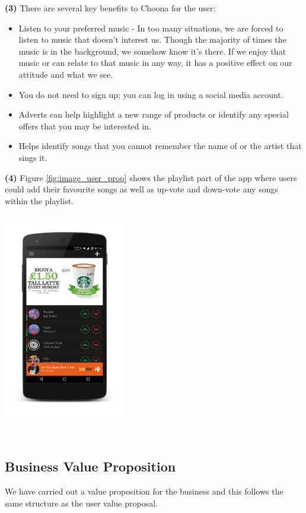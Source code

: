 \textbf{(3)} There are several key benefits to Choona for the user:
\begin{itemize}
\item Listen to your preferred music - In too many situations, we are forced to listen to music that doesn't interest us.  Though the majority of times the music is in the background, we somehow know it's there.  If we enjoy that music or can relate to that music in any way, it has a positive effect on our attitude and what we see.
\item You do not need to sign up; you can log in using a social media account.
\item Adverts can help highlight a new range of products or identify any special offers that you may be interested in.
\item Helps identify songs that you cannot remember the name of or the artist that sings it.
\end{itemize} 

\textbf{(4)} Figure \ref{fig:image_user_prop} shows the playlist part of the app where users could add their favourite songs as well as up-vote and down-vote any songs within the playlist.\\
\begin{minipage}{\linewidth}
\centering
\includegraphics[width=0.4\textwidth]{./img/idea_user_prop.png}
\label{fig:image_user_prop}
\end{minipage}\\

\subsection{Business Value Proposition}
We have carried out a value proposition for the business and this follows the same structure as the user value proposal.\\

